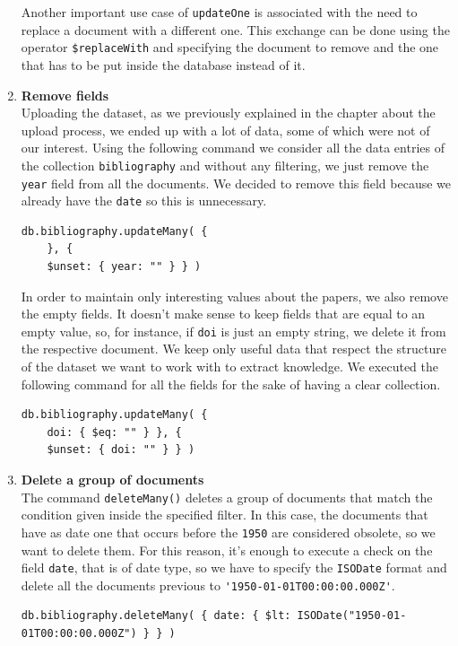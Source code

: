\begin{enumerate}
    Another important use case of \verb|updateOne| is associated with the need to replace a document with a different one.
    This exchange can be done using the operator \verb|$replaceWith| and specifying the document to remove and the one that has to be put inside the database instead of it.
    \item \textbf{Remove fields} \\
    Uploading the dataset, as we previously explained in the chapter about the upload process, we ended up with a lot of data, some of which were not of our interest.
    Using the following command we consider all the data entries of the collection \verb|bibliography| and without any filtering, we just remove the \verb|year| field from all the documents.
    We decided to remove this field because we already have the \verb|date| so this is unnecessary.
    \begin{lstlisting}[label={lst:command3mongodb1}]
db.bibliography.updateMany( {
    }, {
    $unset: { year: "" } } )
    \end{lstlisting}
    In order to maintain only interesting values about the papers, we also remove the empty fields.
    It doesn't make sense to keep fields that are equal to an empty value, so, for instance, if \verb|doi| is just an empty string, we delete it from the respective document.
    We keep only useful data that respect the structure of the dataset we want to work with to extract knowledge.
    We executed the following command for all the fields for the sake of having a clear collection.
    \begin{lstlisting}[label={lst:command3mongodb2}]
db.bibliography.updateMany( {
    doi: { $eq: "" } }, {
    $unset: { doi: "" } } )
    \end{lstlisting}
    \item \textbf{Delete a group of documents} \\
    The command \verb|deleteMany()| deletes a group of documents that match the condition given inside the specified filter.
    In this case, the documents that have as date one that occurs before the \verb|1950| are considered obsolete, so we want to delete them.
    For this reason, it's enough to execute a check on the field \verb|date|, that is of date type, so we have to specify the \verb|ISODate| format and delete all the documents previous to \verb|'1950-01-01T00:00:00.000Z'|.
    \begin{lstlisting}[label={lst:command4mongodb}]
db.bibliography.deleteMany( { date: { $lt: ISODate("1950-01-01T00:00:00.000Z") } } )

\end{lstlisting}
\end{enumerate}
